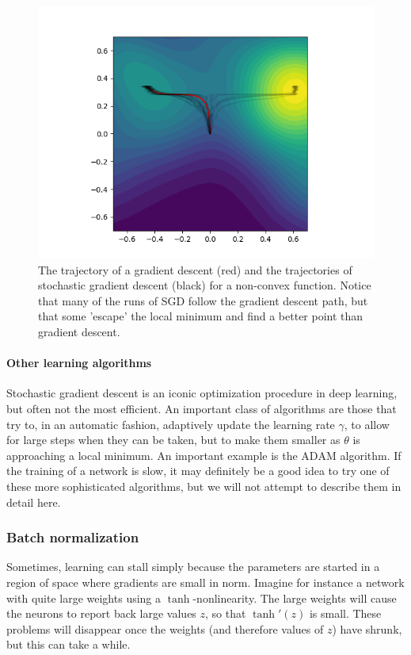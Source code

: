 \documentclass{article}
\begin{document}
\begin{figure}
    \centering
    \includegraphics[width=.6\textwidth]{graphics/sgd.png}
    \caption{The trajectory of a gradient descent (red) and the trajectories of stochastic gradient descent (black) for a non-convex function. Notice that many of the runs of SGD follow the gradient descent path, but that some 'escape' the local minimum and find a better point than gradient descent.}
    \label{fig:sgd}
\end{figure}


\paragraph{Other learning algorithms}
Stochastic gradient descent is an iconic optimization procedure in deep learning, but often not the most efficient. An important class of algorithms are those that try to, in an automatic fashion, adaptively update the learning rate $\gamma$, to allow for large steps when they can be taken, but to make them smaller as $\theta$ is approaching a local minimum. An important example is the $\mathrm{ADAM}$ algorithm. If the training of a network is slow, it may definitely be a good idea to try one of these more sophisticated algorithms, but we will not attempt to describe them in detail here.



\subsubsection{Batch normalization} Sometimes, learning can stall simply because the parameters are started in a region of space where gradients are small in norm. Imagine for instance a network with quite large weights using a $\tanh$-nonlinearity. The large weights will cause the neurons to report back large values $z$, so that $\tanh'(z)$ is small. These problems will disappear once the weights (and therefore values of $z$) have shrunk, but this can take a while.
\end{document}
